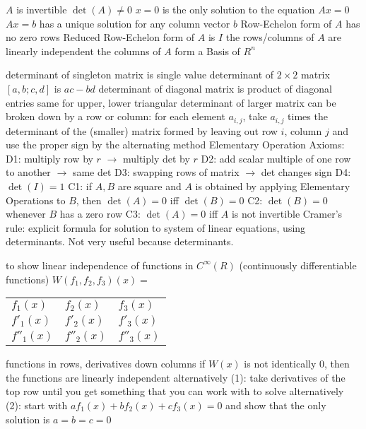 \documentclass[12pt]{article}
\begin{document}
\begin{multicols*}{2}
\begin{flushleft}
\begin{outline}[longenum]
  \1 $A$ is invertible
  \1 $\det(A) \not= 0$
  \1 $x=0$ is the only solution to the equation $Ax=0$
  \1 $Ax=b$ has a unique solution for any column vector $b$
  \1 Row-Echelon form of $A$ has no zero rows
  \1 Reduced Row-Echelon form of $A$ is $I$
  \1 the rows/columns of $A$ are linearly independent
  \1 the columns of $A$ form a Basis of $R^n$


  \1 determinant of singleton matrix is single value
  \1 determinant of $2\times 2$ matrix $[a,b;c,d]$ is $ac-bd$
  \1 determinant of diagonal matrix is product of diagonal entries
    \2 same for upper, lower triangular
  \1 determinant of larger matrix can be broken down by a row or column:
    \2 for each element $a_{i,j}$, take $a_{i,j}$ times the determinant of  the (smaller) matrix formed by leaving out row $i$, column $j$
    \2 and use the proper sign by the alternating method
  \1 Elementary Operation Axioms:
    \2 D1: multiply row by $r$ $\rightarrow$ multiply det by $r$
    \2 D2: add scalar multiple of one row to another $\rightarrow$ same det
    \2 D3: swapping rows of matrix $\rightarrow$ det changes sign
    \2 D4: $\det(I) = 1$
    \2 C1: if $A,B$ are square and $A$ is obtained by applying Elementary Operations to $B$, then $\det(A)=0$ iff $\det(B)=0$
    \2 C2: $\det(B)=0$ whenever $B$ has a zero row
    \2 C3: $\det(A)=0$ iff $A$ is not invertible
  \1 Cramer's rule: explicit formula for solution to system of linear equations, using determinants. Not very useful because determinants.

  \1 to show linear independence of functions in $C^{\infty}(R)$ (continuously differentiable functions)
  \1 $W(f_1,f_2,f_3)(x) = $
    \begin{tabular}{|l l l|}
      $f_1(x)$ & $f_2(x)$ & $f_3(x)$ \\
      $f'_1(x)$ & $f'_2(x)$ & $f'_3(x)$ \\
      $f''_1(x)$ & $f''_2(x)$ & $f''_3(x)$ \\
    \end{tabular}
      \2 functions in rows, derivatives down columns
  \1 if $W(x)$ is not identically $0$, then the functions are linearly independent
  \1 alternatively (1): take derivatives of the top row until you get something that you can work with to solve
  \1 alternatively (2): start with $af_1(x)+bf_2(x)+cf_3(x)=0$ and show that the only solution is $a=b=c=0$



\end{outline}
\end{flushleft}
\end{multicols*}
\end{document}
